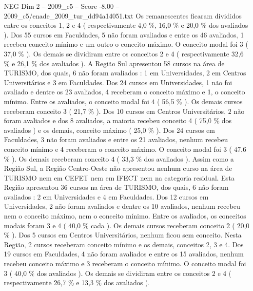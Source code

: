\begin{textsample}{NEG Dim 2 – 2009\_c5 – Score -8.00 – 2009\_c5/enade\_2009\_tur\_dd94a14051.txt}
Os remanescentes ficaram divididos entre os conceitos 1, 2 e 4 ( respectivamente 4,0 \%, 16,0 \% e 20,0 \% dos avaliados ).
Dos 55 cursos em Faculdades, 5 não foram avaliados e entre os 46 avaliados, 1 recebeu conceito mínimo e um outro o conceito máximo.
O conceito modal foi 3 ( 37,0 \% ).
Os demais se dividiram entre os conceitos 2 e 4 ( respectivamente 32,6 \% e 26,1 \% dos avaliados ).
A Região Sul apresentou 58 cursos na área de TURISMO, dos quais, 6 não foram avaliados : 1 em Universidades, 2 em Centros Universitários e 3 em Faculdades.
Dos 24 cursos em Universidades, 1 não foi avaliado e dentre os 23 avaliados, 4 receberam o conceito máximo e 1, o conceito mínimo.
Entre os avaliados, o conceito modal foi 4 ( 56,5 \% ).
Os demais cursos receberam conceito 3 ( 21,7 \% ).
Dos 10 cursos em Centros Universitários, 2 não foram avaliados e dos 8 avaliados, a maioria recebeu conceito 4 ( 75,0 \% dos avaliados ) e os demais, conceito máximo ( 25,0 \% ).
Dos 24 cursos em Faculdades, 3 não foram avaliados e entre os 21 avaliados, nenhum recebeu conceito mínimo e 4 receberam o conceito máximo.
O conceito modal foi 3 ( 47,6 \% ).
Os demais receberam conceito 4 ( 33,3 \% dos avaliados ).
Assim como a Região Sul, a Região Centro-Oeste não apresentou nenhum curso na área de TURISMO nem em CEFET nem em IFECT nem na categoria residual.
Esta Região apresentou 36 cursos na área de TURISMO, dos quais, 6 não foram avaliados : 2 em Universidades e 4 em Faculdades.
Dos 12 cursos em Universidades, 2 não foram avaliados e dentre os 10 avaliados, nenhum recebeu nem o conceito máximo, nem o conceito mínimo.
Entre os avaliados, os conceitos modais foram 3 e 4 ( 40,0 \% cada ).
Os demais cursos receberam conceito 2 ( 20,0 \% ).
Dos 5 cursos em Centros Universitários, nenhum ficou sem conceito.
Nesta Região, 2 cursos receberam conceito mínimo e os demais, conceitos 2, 3 e 4.
Dos 19 cursos em Faculdades, 4 não foram avaliados e entre os 15 avaliados, nenhum recebeu conceito máximo e 3 receberam o conceito mínimo.
O conceito modal foi 3 ( 40,0 \% dos avaliados ).
Os demais se dividiram entre os conceitos 2 e 4 ( respectivamente 26,7 \% e 13,3 \% dos avaliados ).

\end{textsample}
